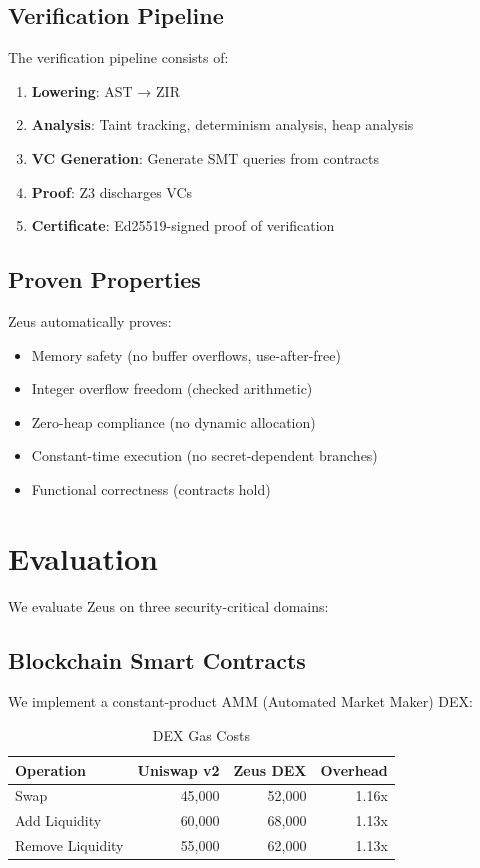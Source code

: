 \documentclass[sigplan,screen]{acmart}
\begin{document}
\subsection{Verification Pipeline}

The verification pipeline consists of:
\begin{enumerate}
\item \textbf{Lowering}: AST → ZIR
\item \textbf{Analysis}: Taint tracking, determinism analysis, heap analysis
\item \textbf{VC Generation}: Generate SMT queries from contracts
\item \textbf{Proof}: Z3 discharges VCs
\item \textbf{Certificate}: Ed25519-signed proof of verification
\end{enumerate}

\subsection{Proven Properties}

Zeus automatically proves:
\begin{itemize}
\item Memory safety (no buffer overflows, use-after-free)
\item Integer overflow freedom (checked arithmetic)
\item Zero-heap compliance (no dynamic allocation)
\item Constant-time execution (no secret-dependent branches)
\item Functional correctness (contracts hold)
\end{itemize}

\section{Evaluation}

We evaluate Zeus on three security-critical domains:

\subsection{Blockchain Smart Contracts}

We implement a constant-product AMM (Automated Market Maker) DEX:

\begin{table}
\centering
\caption{DEX Gas Costs}
\begin{tabular}{lrrr}
\toprule
Operation & Uniswap v2 & Zeus DEX & Overhead \\
\midrule
Swap & 45,000 & 52,000 & 1.16x \\
Add Liquidity & 60,000 & 68,000 & 1.13x \\
Remove Liquidity & 55,000 & 62,000 & 1.13x \\
\bottomrule
\end{tabular}
\end{table}
\end{document}
